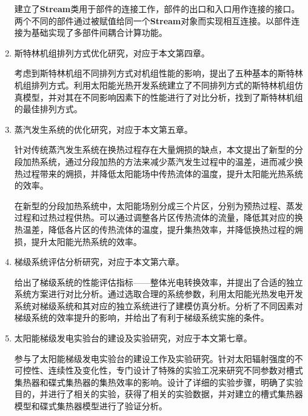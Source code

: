 \begin{enumerate}[label=(\arabic*)]
	建立了\textbf{Stream}类用于部件的连接工作，部件的出口和入口用作连接的接口。两个不同的部件通过被赋值给同一个\textbf{Stream}对象而实现相互连接。以部件连接为基础实现了多部件间耦合计算功能。

	\item 斯特林机组排列方式优化研究，对应于本文第四章。
	
	考虑到斯特林机组不同排列方式对机组性能的影响，提出了五种基本的斯特林机组排列方式。利用太阳能光热开发系统建立了不同排列方式的斯特林机组仿真模型，并对其在不同影响因素下的性能进行了对比分析，找到了斯特林机组的最佳排列方式。

	\item 蒸汽发生系统的优化研究，对应于本文第五章。
	
	针对传统蒸汽发生系统在换热过程存在大量㶲损的缺点，本文提出了新型的分段加热系统，通过分段加热的方法来减少蒸汽发生过程中的温差，进而减少换热过程带来的㶲损，并降低太阳能场中传热流体的温度，提升太阳能光热系统的效率。
	
	在新型的分段加热系统中，太阳能场别分成三个片区，分别为预热过程、蒸发过程和过热过程供热。可以通过调整各片区传热流体的流量，降低其对应的换热温差，降低各片区的传热流体的温度，提升集热效率，并降低换热过程的㶲损，提升太阳能光热系统的效率。

	\item 梯级系统评估分析研究，对应于本文第六章。
	
	给出了梯级系统的性能评估指标——整体光电转换效率，并提出了合适的独立系统方案进行对比分析。通过选取合理的系统参数，利用太阳能光热发电开发系统对梯级系统和其对应的独立系统进行了建模仿真分析。分析了不同因素对梯级系统的效率提升的影响，并给出了有利于梯级系统实施的条件。

	\item 太阳能梯级发电实验台的建设及实验研究，对应于本文第七章。
	
	参与了太阳能梯级发电实验台的建设工作及实验研究。针对太阳辐射强度的不可控性、连续性及变化性，专门设计了特殊的实验工况来研究不同参数对槽式集热器和碟式集热器的集热效率的影响。设计了详细的实验步骤，明确了实验目的，并进行了相关的实验，获得了相关的实验数据，并对建立的槽式集热器模型和碟式集热器模型进行了验证分析。
\end{enumerate}
